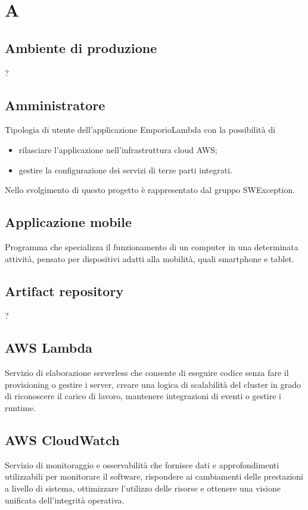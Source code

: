 \section*{A}
\subsection*{Ambiente di produzione}
?

\subsection*{Amministratore}
Tipologia di utente dell'applicazione EmporioLambda con la possibilità di
\begin{itemize}
    \item rilasciare l'applicazione nell'infrastruttura cloud AWS;
    \item gestire la configurazione dei servizi di terze parti integrati.
\end{itemize}
Nello svolgimento di questo progetto è rappresentato dal gruppo SWException.

\subsection*{Applicazione mobile}
Programma che specializza il funzionamento di un computer in una determinata attività,
pensato per dispositivi adatti alla mobilità, quali smartphone e tablet.

\subsection*{Artifact repository}
?

\subsection*{AWS Lambda}
Servizio di elaborazione serverless che consente di eseguire codice senza fare il provisioning o gestire i server, creare una logica di scalabilità del cluster in grado di riconoscere il carico di lavoro, mantenere integrazioni di eventi o gestire i runtime.

\subsection*{AWS CloudWatch}
Servizio di monitoraggio e osservabilità che fornisce dati e approfondimenti utilizzabili per monitorare il software, rispondere ai cambiamenti delle prestazioni a livello di sistema, ottimizzare l'utilizzo delle risorse e ottenere una visione unificata dell'integrità operativa.

